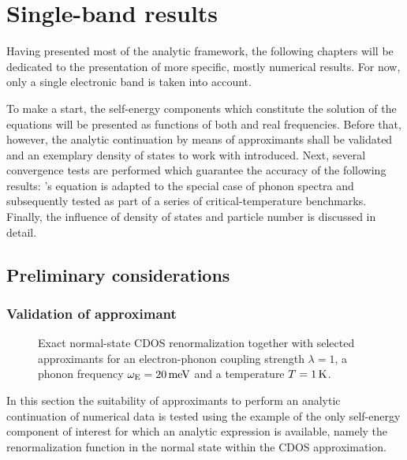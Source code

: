 
\chapter{Single-band results}
\label{single-band results}

Having presented most of the analytic framework, the following chapters will be
dedicated to the presentation of more specific, mostly numerical results. For
now, only a single electronic band is taken into account.

To make a start, the self-energy components which constitute the solution of the
 equations will be presented as functions of both
 and real frequencies. Before that, however, the analytic
continuation by means of  approximants shall be validated and an
exemplary density of states to work with introduced. Next, several convergence
tests are performed which guarantee the accuracy of the following results:
's equation is adapted to the special case of 
phonon spectra and subsequently tested as part of a series of
critical-temperature benchmarks. Finally, the influence of density of states and
particle number is discussed in detail.

\section{Preliminary considerations}

\subsection{Validation of  approximant}

\begin{figure}
    
    
    \caption[Exact renormalization function]{
        Exact normal-state CDOS renormalization together with selected
         approximants for an electron-phonon coupling strength
        $\lambda = 1$, a phonon frequency $\omega \sb{\text{E}} = 20 \, \mathrm{meV}$ and
        a temperature $T = 1 \, \mathrm K$.}
    \label{validation Pade}
\end{figure}
%
In this section the suitability of  approximants to perform an
analytic continuation of numerical data is tested using the example of the only
self-energy component of interest for which an analytic expression is available,
namely the renormalization function in the normal state within the CDOS
approximation.

